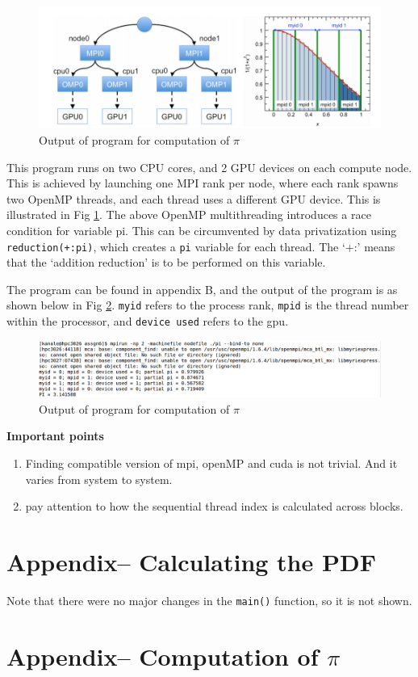 \documentclass[11pt, oneside]{article}   	%
\begin{document}
\begin{figure}[!htbp] \label{fig:piSchematic}
	\centering
	\includegraphics[scale=0.4]{piSchematic.png}
	\caption{Output of program for computation of $\pi$}
\end{figure}

This program runs on two CPU cores, and 2 GPU devices on each compute node. This is achieved by launching one MPI rank per node, where each rank spawns two OpenMP threads, and each thread uses a different GPU device. This is illustrated in Fig \ref{fig:piSchematic}. The above OpenMP multithreading introduces a race condition for variable pi. This can be circumvented by data privatization using \texttt{reduction(+:pi)}, which creates a \texttt{pi} variable for each thread. The `+:' means that the `addition reduction' is to be performed on this variable.

The program can be found in appendix B, and the output of the program is as shown below in Fig \ref{fig:pi}. \texttt{myid} refers to the process rank, \texttt{mpid} is the thread number within the processor, and \texttt{device used} refers to the gpu.
\begin{figure}[!htbp] \label{fig:pi}
	\centering
	\includegraphics[scale=0.32]{piCalc.png}
	\caption{Output of program for computation of $\pi$}
\end{figure}

\textbf{Important points}\begin{enumerate}
 \item Finding compatible version of mpi, openMP and cuda is not trivial. And it varies from system to system.
 \item pay attention to how the sequential thread index is calculated across blocks.
\end{enumerate} 

\pagebreak
\appendix
\section{Appendix-- Calculating the PDF}
Note that there were no major changes in the \texttt{main()} function, so it is not shown.


\section{Appendix-- Computation of $\pi$}

\end{document}
